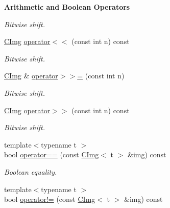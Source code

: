 \begin{Indent}{\bf Arithmetic and Boolean Operators}
\begin{DoxyCompactItemize}
\begin{DoxyCompactList}\small\item\em Bitwise shift. \end{DoxyCompactList}\item 
\hypertarget{structcimg__library_1_1_c_img_ac6a7101d9f6045257e2f94f7b0d69bd8}{\hyperlink{structcimg__library_1_1_c_img}{C\-Img} \hyperlink{structcimg__library_1_1_c_img_ac6a7101d9f6045257e2f94f7b0d69bd8}{operator$<$$<$} (const int n) const }\label{structcimg__library_1_1_c_img_ac6a7101d9f6045257e2f94f7b0d69bd8}

\begin{DoxyCompactList}\small\item\em Bitwise shift. \end{DoxyCompactList}\item 
\hypertarget{structcimg__library_1_1_c_img_a0060f246f494ade9155949368662f58d}{\hyperlink{structcimg__library_1_1_c_img}{C\-Img} \& \hyperlink{structcimg__library_1_1_c_img_a0060f246f494ade9155949368662f58d}{operator$>$$>$=} (const int n)}\label{structcimg__library_1_1_c_img_a0060f246f494ade9155949368662f58d}

\begin{DoxyCompactList}\small\item\em Bitwise shift. \end{DoxyCompactList}\item 
\hypertarget{structcimg__library_1_1_c_img_ae4a3428bb98f41f26cd50533d917686c}{\hyperlink{structcimg__library_1_1_c_img}{C\-Img} \hyperlink{structcimg__library_1_1_c_img_ae4a3428bb98f41f26cd50533d917686c}{operator$>$$>$} (const int n) const }\label{structcimg__library_1_1_c_img_ae4a3428bb98f41f26cd50533d917686c}

\begin{DoxyCompactList}\small\item\em Bitwise shift. \end{DoxyCompactList}\item 
\hypertarget{structcimg__library_1_1_c_img_a8f14417d6f2090f20cec1716c963ee3a}{{\footnotesize template$<$typename t $>$ }\\bool \hyperlink{structcimg__library_1_1_c_img_a8f14417d6f2090f20cec1716c963ee3a}{operator==} (const \hyperlink{structcimg__library_1_1_c_img}{C\-Img}$<$ t $>$ \&img) const }\label{structcimg__library_1_1_c_img_a8f14417d6f2090f20cec1716c963ee3a}

\begin{DoxyCompactList}\small\item\em Boolean equality. \end{DoxyCompactList}\item 
\hypertarget{structcimg__library_1_1_c_img_a6972602ac9b5e1e063263f256e257ffb}{{\footnotesize template$<$typename t $>$ }\\bool \hyperlink{structcimg__library_1_1_c_img_a6972602ac9b5e1e063263f256e257ffb}{operator!=} (const \hyperlink{structcimg__library_1_1_c_img}{C\-Img}$<$ t $>$ \&img) const }\label{structcimg__library_1_1_c_img_a6972602ac9b5e1e063263f256e257ffb}


\end{DoxyCompactItemize}
\end{Indent}
